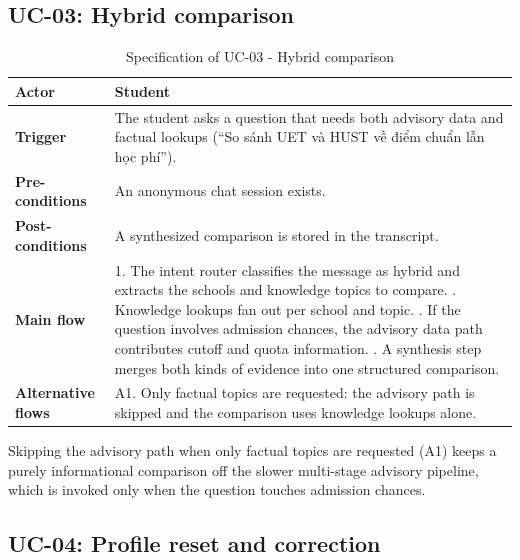 \documentclass[../main.tex]{subfiles}
\begin{document}
\subsection{UC-03: Hybrid comparison}

\begin{table}[H]
    \centering
    \caption{Specification of UC-03 - Hybrid comparison}
    \label{table:uc03}
    \begin{tabular}{|p{3.2cm}|p{10.3cm}|}
        \hline
        \textbf{Actor} & Student \\
        \hline
        \textbf{Trigger} & The student asks a question that needs both advisory data and factual lookups (``So sánh UET và HUST về điểm chuẩn lẫn học phí''). \\
        \hline
        \textbf{Pre-conditions} & An anonymous chat session exists. \\
        \hline
        \textbf{Post-conditions} & A synthesized comparison is stored in the transcript. \\
        \hline
        \textbf{Main flow} &
        1. The intent router classifies the message as hybrid and extracts the schools and knowledge topics to compare. \newline
        2. Knowledge lookups fan out per school and topic. \newline
        3. If the question involves admission chances, the advisory data path contributes cutoff and quota information. \newline
        4. A synthesis step merges both kinds of evidence into one structured comparison. \\
        \hline
        \textbf{Alternative flows} &
        A1. Only factual topics are requested: the advisory path is skipped and the comparison uses knowledge lookups alone. \\
        \hline
    \end{tabular}
\end{table}

Skipping the advisory path when only factual topics are requested (A1) keeps a purely informational comparison off the slower multi-stage advisory pipeline, which is invoked only when the question touches admission chances.

\subsection{UC-04: Profile reset and correction}
\end{document}
